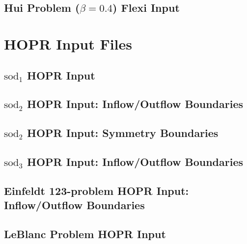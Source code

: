 \begin{appendices}
\subsection{Hui Problem ($\beta = 0.4$) Flexi Input}\label{ssec:flexiin-hui-Rot}



\section{HOPR Input Files}\label{Asec:hoprinput}

\subsection{$\mathrm{sod}_1$ HOPR Input}\label{ssec:hoprin-sod1}


\subsection{$\mathrm{sod}_2$ HOPR Input: Inflow/Outflow Boundaries}\label{ssec:hoprin-sod2-BC2}


\subsection{$\mathrm{sod}_2$ HOPR Input: Symmetry Boundaries}\label{ssec:hoprin-sod2-BC9}


\subsection{$\mathrm{sod}_3$ HOPR Input: Inflow/Outflow Boundaries}\label{ssec:hoprin-sod3-BC9}


\subsection{Einfeldt 123-problem HOPR Input: Inflow/Outflow Boundaries}\label{ssec:hoprin-einfeldt}


\subsection{LeBlanc Problem HOPR Input}\label{ssec:hoprin-leblanc}



\end{appendices}

